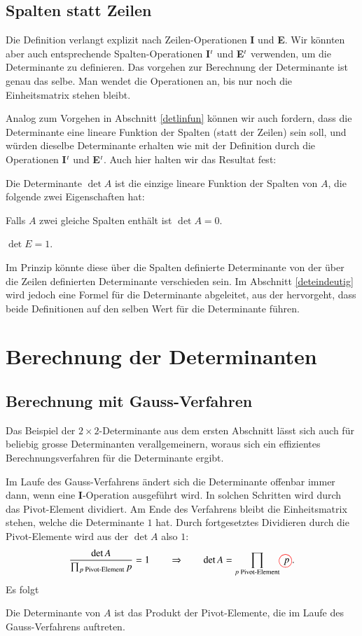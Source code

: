 \subsection{Spalten statt Zeilen}
Die Definition verlangt explizit nach Zeilen-Operationen {\bf I}
und {\bf E}.
Wir könnten aber auch entsprechende Spalten-Operationen
{\bf I$\mathstrut^t$}
und
{\bf E$\mathstrut^t$}
verwenden, um die Determinante zu definieren.
Das vorgehen zur Berechnung der Determinante ist genau das selbe.
Man wendet die Operationen an, bis nur noch die Einheitsmatrix stehen bleibt.

Analog zum Vorgehen in Abschnitt \ref{detlinfun} können wir auch
fordern, dass die Determinante eine lineare Funktion der Spalten
(statt der Zeilen) sein soll, und würden dieselbe Determinante
erhalten wie mit der Definition durch die Operationen 
{\bf I$\mathstrut^t$}
und
{\bf E$\mathstrut^t$}.
Auch hier halten wir das Resultat fest:
\begin{satz}
Die Determinante
$\det A$ ist die einzige lineare Funktion der Spalten von $A$, die folgende
zwei Eigenschaften hat:
\begin{compactenum}
\item Falls $A$ zwei gleiche Spalten enthält ist $\det A=0$.
\item $\det E = 1$.
\end{compactenum}
\end{satz}
Im Prinzip könnte diese über die Spalten definierte Determinante
von der über die Zeilen definierten Determinante verschieden sein.
Im Abschnitt \ref{deteindeutig} wird jedoch eine Formel für die
Determinante abgeleitet, aus der hervorgeht, dass beide Definitionen
auf den selben Wert für die Determinante führen.

\section{Berechnung der Determinanten}
\subsection{Berechnung mit Gauss-Verfahren}
Das Beispiel der $2\times 2$-Determinante aus dem ersten Abschnitt
lässt sich auch für beliebig grosse Determinanten verallgemeinern,
woraus sich ein effizientes Berechnungsverfahren für die Determinante
ergibt.

Im Laufe des Gauss-Verfahrens ändert sich die Determinante offenbar
immer dann, wenn eine {\bf I}-Operation ausgeführt wird.
In solchen Schritten wird durch das Pivot-Element dividiert.
Am Ende des 
Verfahrens bleibt die Einheitsmatrix stehen, welche die Determinante
$1$ hat.
Durch fortgesetztes Dividieren durch die Pivot-Elemente wird
aus der $\det A$ also $1$:
\[
\frac{\det A}{\prod_{\text{$p$ Pivot-Element} }p}=1\qquad\Rightarrow
\qquad
\det A=\prod_{\text{$p$ Pivot-Element}} p%
\begin{picture}(0,0)
\color{red}\put(-4,2){\circle{13}}
\end{picture}%
\;.
\]
Es folgt
\begin{satz}
\label{detprodpivot}
Die Determinante von $A$ ist das Produkt der Pivot-Elemente,
die im Laufe des Gauss-Verfahrens auftreten.
\end{satz}


